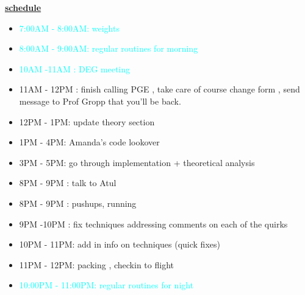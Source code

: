 \documentclass[11pt]{article}
\newcommand{\regItem}[1]{\item \textcolor{cyan}{#1}}
\begin{document}
\underline{\textbf{schedule}}\\
\begin{itemize}
\regItem{7:00AM - 8:00AM: weights}
\regItem{8:00AM - 9:00AM: regular routines for morning}
\regItem {10AM -11AM : DEG meeting}
\item 11AM - 12PM  : finish calling PGE , take care of course change form , send message to Prof Gropp that you'll be back.
\item 12PM - 1PM: update theory section
\item 1PM - 4PM: Amanda's code lookover
\item 3PM - 5PM: go through implementation + theoretical analysis
\item 8PM - 9PM : talk to Atul
\item 8PM - 9PM : pushups, running
\item 9PM -10PM :  fix techniques addressing comments on each of the quirks
\item 10PM - 11PM: add in info on techniques (quick fixes)
\item 11PM - 12PM: packing , checkin to flight
\regItem{10:00PM - 11:00PM: regular routines for night}
\end{itemize}
\end{document}
